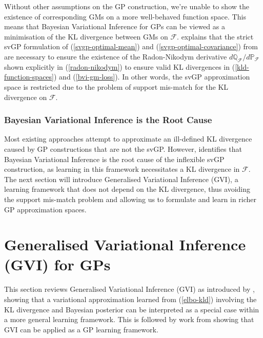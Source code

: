 \documentclass{article}
\numberwithin{equation}{section}
\begin{document}
Without other assumptions on the GP construction, we're unable to show the existence of corresponding GMs on a more well-behaved function space. This means that Bayesian Variational Inference for GPs can be viewed as a minimisation of the KL divergence between GMs on $\mathcal{F}$. \cite{matthews2016sparse} explains that the strict svGP formulation of (\ref{svgp-optimal-mean}) and (\ref{svgp-optimal-covariance}) from \cite{titsias2009variational} are necessary to ensure the existence of the Radon-Nikodym derivative $d \mathbb{Q}_\mathcal{F}/d \mathbb{P}_\mathcal{F}$ shown explicitly in (\ref{radon-nikodym}) to ensure valid KL divergences in (\ref{kld-function-spaces}) and (\ref{bvi-gm-loss}). In other words, the svGP approximation space is restricted due to the problem of support mis-match for the KL divergence on $\mathcal{F}$.

\subsubsection{Bayesian Variational Inference is the Root Cause}
Most existing approaches attempt to approximate an ill-defined KL divergence caused by GP constructions that are not the svGP. However, \cite{wild2022generalized} identifies that Bayesian Variational Inference is the root cause of the inflexible svGP construction, as learning in this framework necessitates a KL divergence in $\mathcal{F}$. The next section will introduce Generalised Variational Inference (GVI), a learning framework that does not depend on the KL divergence, thus avoiding the support mis-match problem and allowing us to formulate and learn in richer GP approximation spaces.

\newpage
\section{Generalised Variational Inference (GVI) for GPs}
This section reviews Generalised Variational Inference (GVI) as introduced by \cite{knoblauch2022optimization}, showing that a variational approximation learned from (\ref{elbo-kld}) involving the KL divergence and Bayesian posterior can be interpreted as a special case within a more general learning framework. This is followed by work from \cite{wild2022generalized} showing that GVI can be applied as a GP learning framework.
\end{document}
